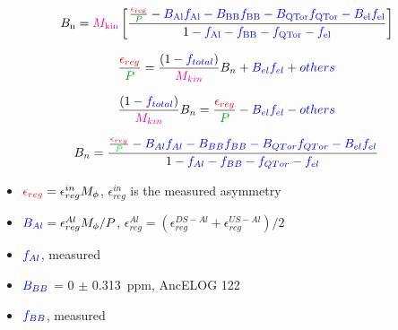 \documentclass[xcolor=x11names,compress,8pt]{beamer}
\renewcommand{\(}{\begin{columns}}
\renewcommand{\)}{\end{columns}}
\newcommand{\<}[1]{\begin{column}{#1}}
\renewcommand{\>}{\end{column}}
\begin{document}
\begin{frame}

\begin{equation} \label{equ:eqPhysicsAsymmetry104}
\textcolor{black}{B_{\rm n}} =  \textcolor{magenta}{M_{\rm kin}} \left[ \frac{\frac{\textcolor{red}{\epsilon_{\rm reg}}}{\textcolor{darkgreen}{P}} - \textcolor{blue}{ B_{\rm Al}f_{\rm Al} - B_{\rm BB}f_{\rm BB} - B_{\rm QTor}f_{\rm QTor} - B_{\rm el}f_{\rm el} } }{1 - \textcolor{blue}{ f_{\rm Al} - f_{\rm BB} - f_{\rm QTor} - f_{\rm el} }} \right] 
\end{equation}

\begin{equation} \label{equ:eqPhysicsAsymmetry104}
\frac{\textcolor{red}{\epsilon_{reg}}}{\textcolor{darkgreen}{P}} = \frac{(1 - \textcolor{blue}{f_{total}})}{\textcolor{magenta}{M_{kin}}}B_{n} + \textcolor{blue}{B_{el}f_{el}} + \textcolor{blue}{others}
\end{equation}

\begin{equation} \label{equ:eqPhysicsAsymmetry104}
\frac{(1 - \textcolor{blue}{f_{total}})}{\textcolor{magenta}{M_{kin}}}B_{n} = \frac{\textcolor{red}{\epsilon_{reg}}}{\textcolor{darkgreen}{P}} - \textcolor{blue}{B_{el}f_{el}} - \textcolor{blue}{others}
\end{equation}


\begin{equation} \label{equ:eqPhysicsAsymmetry104}
\textcolor{black}{B_{n}} =  \frac{\frac{\textcolor{red}{\epsilon_{reg}}}{\textcolor{green}{P}} - \textcolor{blue}{ B_{Al}f_{Al} - B_{BB}f_{BB} - B_{QTor}f_{QTor} - B_{el}f_{el} } }{1 - \textcolor{blue}{ f_{Al} - f_{BB} - f_{QTor} - f_{el} }}
\end{equation}

\begin{itemize}
\item 
$\textcolor{red}{\epsilon_{reg}} = \epsilon_{reg}^{in}M_{\phi}$, $\epsilon_{reg}^{in}$ is the measured asymmetry

\item 
$\textcolor{blue}{B_{Al}} = \epsilon_{reg}^{Al}M_{\phi}/P$, 
$\epsilon_{reg}^{Al} = (\epsilon_{reg}^{DS-Al} + \epsilon_{reg}^{US-Al})/2$
\item 
$\textcolor{blue}{f_{Al}}$, measured

\item 
$\textcolor{blue}{B_{BB}}$ = 0 $\pm$ 0.313~ppm, AncELOG 122
\item 
$\textcolor{blue}{f_{BB}}$, measured


\end{itemize}
\end{frame}
\end{document}
